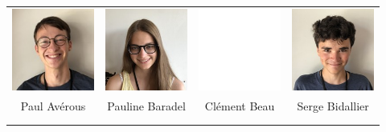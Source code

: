 

\vspace{2mm}
\begin{center}
\begin{tabular}{cccc}
\includegraphics[angle=270,origin=c, width=27mm]{eleves/Averous Paul.JPG} &
\includegraphics[angle=270,origin=c, width=27mm]{eleves/Baradel Pauline.JPG} &
\includegraphics[angle=270,origin=c, width=27mm]{vide.JPG} &
\includegraphics[angle=270,origin=c, width=27mm]{eleves/Bidallier Serge.JPG} \\
Paul Avérous & Pauline Baradel & Clément Beau & Serge Bidallier \\ \\ \\ 


\end{tabular}
\end{center}
